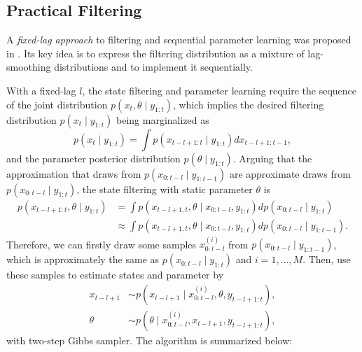 \subsection{Practical Filtering}

A \textit{fixed-lag approach} to filtering and sequential parameter learning was proposed in \cite{polson2008practical}. Its key idea is to express the filtering distribution as a mixture of lag-smoothing distributions and to implement it sequentially. 

With a fixed-lag $l$, the state filtering and parameter learning require the sequence of the joint distribution $p(x_t,\theta\mid y_{1:t})$, which implies the desired filtering distribution $p(x_t\mid y_{1:t})$ being marginalized as 
\begin{equation*}
p(x_t\mid y_{1:t}) = \int p(x_{t-l+1:t}\mid y_{1:t}) dx_{t-l+1:t-1},
\end{equation*}
and the parameter posterior distribution $p(\theta\mid y_{1:t})$. Arguing that the approximation that draws from $p(x_{0:t-l}\mid y_{1:t-1})$ are approximate draws from $p(x_{0:t-l}\mid y_{1:t})$, the state filtering with static parameter $\theta$ is 
\begin{align*}
p(x_{t-l+1:t},\theta\mid y_{1:t}) &=\int p(x_{t-l+1,t},\theta \mid x_{0:t-l},y_{1:t}) dp(x_{0:t-l}\mid y_{1:t}) \\
&\approx \int p(x_{t-l+1,t},\theta \mid x_{0:t-l},y_{1:t}) dp(x_{0:t-l}\mid y_{1:t-1}).
\end{align*}
Therefore, we can firstly draw some samples $x_{0:t-l}^{(i)}$ from $p(x_{0:t-l}\mid y_{1:t-1})$, which is approximately the same as $p(x_{0:t-l}\mid y_{1:t})$ and $i=1,\ldots,M$. Then, use these samples to estimate states and parameter by 
\begin{align*}
x_{t-l+1} &\sim p(x_{t-l+1}\mid x_{0:t-l}^{(i)},\theta,y_{t-l+1:t}),\\
\theta &\sim p(\theta \mid x_{0:t-l}^{(i)},x_{t-l+1},y_{t-l+1:t}),
\end{align*}
with two-step Gibbs sampler. The algorithm is summarized below:


